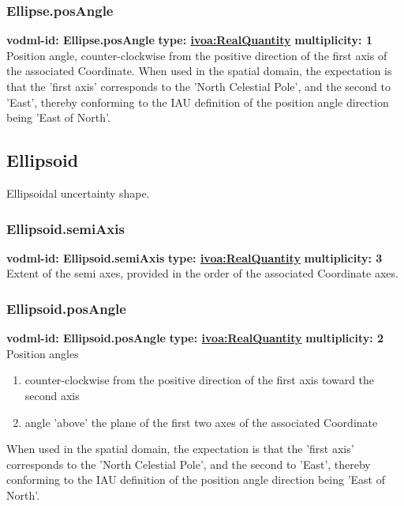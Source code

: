     \subsubsection{Ellipse.posAngle}
      \textbf{vodml-id: Ellipse.posAngle} \newline
      \textbf{type: \hyperref[sect:ivoa]{ivoa:RealQuantity}} \newline
      \textbf{multiplicity: 1} \newline 
      Position angle, counter-clockwise from the positive direction of the first axis of the associated Coordinate. When used in the spatial domain, the expectation is that the 'first axis' corresponds to the 'North Celestial Pole', and the second to 'East', thereby conforming to the IAU definition of the position angle direction being 'East of North'.

  \subsection{Ellipsoid}
  \label{sect:Ellipsoid}
    Ellipsoidal uncertainty shape.

    \subsubsection{Ellipsoid.semiAxis}
      \textbf{vodml-id: Ellipsoid.semiAxis} \newline
      \textbf{type: \hyperref[sect:ivoa]{ivoa:RealQuantity}} \newline
      \textbf{multiplicity: 3} \newline 
      Extent of the semi axes, provided in the order of the associated Coordinate axes.

    \subsubsection{Ellipsoid.posAngle}
      \textbf{vodml-id: Ellipsoid.posAngle} \newline
      \textbf{type: \hyperref[sect:ivoa]{ivoa:RealQuantity}} \newline
      \textbf{multiplicity: 2} \newline 
      Position angles
      \begin{enumerate}
      \item counter-clockwise from the positive direction of the first axis toward the second axis
      \item angle 'above' the plane of the first two axes of the associated Coordinate
      \end{enumerate}
      When used in the spatial domain, the expectation is that the 'first axis' corresponds to the 'North Celestial Pole', and the second to 'East', thereby conforming to the IAU definition of the position angle direction being 'East of North'.
